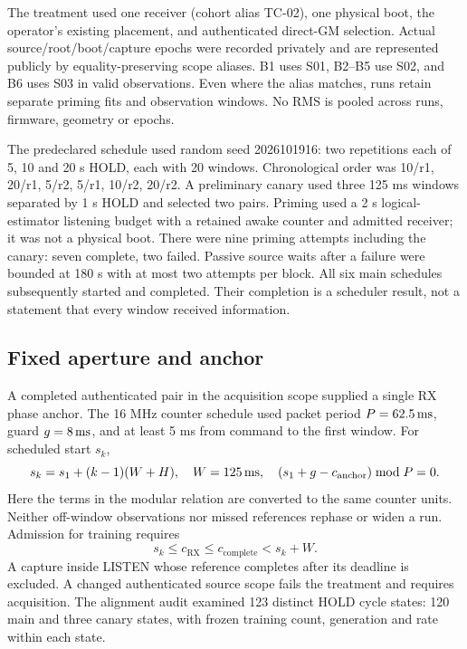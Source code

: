 \documentclass[11pt,letterpaper]{article}
\begin{document}
The treatment used one receiver (cohort alias TC-02), one physical boot, the operator's existing placement, and authenticated direct-GM selection. Actual source/root/boot/capture epochs were recorded privately and are represented publicly by equality-preserving scope aliases. B1 uses S01, B2--B5 use S02, and B6 uses S03 in valid observations. Even where the alias matches, runs retain separate priming fits and observation windows. No RMS is pooled across runs, firmware, geometry or epochs.

The predeclared schedule used random seed 2026101916: two repetitions each of 5, 10 and 20 s HOLD, each with 20 windows. Chronological order was 10/r1, 20/r1, 5/r2, 5/r1, 10/r2, 20/r2. A preliminary canary used three 125 ms windows separated by 1 s HOLD and selected two pairs. Priming used a 2 s logical-estimator listening budget with a retained awake counter and admitted receiver; it was not a physical boot. There were nine priming attempts including the canary: seven complete, two failed. Passive source waits after a failure were bounded at 180 s with at most two attempts per block. All six main schedules subsequently started and completed. Their completion is a scheduler result, not a statement that every window received information.

\subsection{Fixed aperture and anchor}
A completed authenticated pair in the acquisition scope supplied a single RX phase anchor. The 16 MHz counter schedule used packet period $P=62.5\,\mathrm{ms}$, guard $g=8\,\mathrm{ms}$, and at least 5 ms from command to the first window. For scheduled start $s_k$,
\begin{equation}
 s_k=s_1+(k-1)(W+H),\quad W=125\,\mathrm{ms},\quad
 (s_1+g-c_{\mathrm{anchor}})\bmod P=0.\label{eq:schedule}
\end{equation}
Here the terms in the modular relation are converted to the same counter units. Neither off-window observations nor missed references rephase or widen a run. Admission for training requires
\begin{equation}
 s_k\le c_{\mathrm{RX}}\le c_{\mathrm{complete}}<s_k+W.\label{eq:aperture}
\end{equation}
A capture inside LISTEN whose reference completes after its deadline is excluded. A changed authenticated source scope fails the treatment and requires acquisition. The alignment audit examined 123 distinct HOLD cycle states: 120 main and three canary states, with frozen training count, generation and rate within each state.
\end{document}
